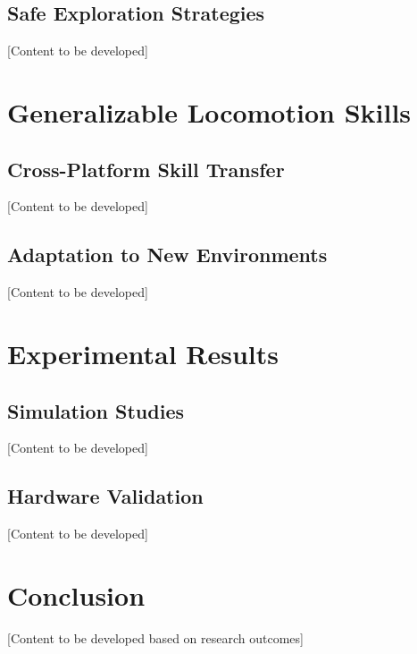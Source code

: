\subsection{Safe Exploration Strategies}

[Content to be developed]

\section{Generalizable Locomotion Skills}

\subsection{Cross-Platform Skill Transfer}

[Content to be developed]

\subsection{Adaptation to New Environments}

[Content to be developed]

\section{Experimental Results}

\subsection{Simulation Studies}

[Content to be developed]

\subsection{Hardware Validation}

[Content to be developed]

\section{Conclusion}

[Content to be developed based on research outcomes]